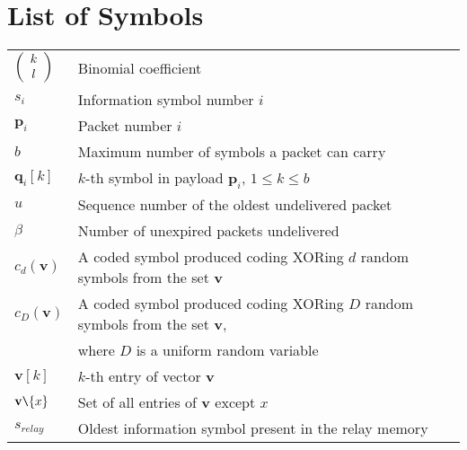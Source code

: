 \chapter*{List of Symbols}

\begin{longtable}{ll}

$\left( {\begin{array}{*{20}c}
                   k\\ l\\ \end{array}} \right) $  & Binomial coefficient\\

$s_i$ & Information symbol number $i$\\
$\mathbf{p}_i$ & Packet number $i$\\
$b$ & Maximum number of symbols a packet can carry\\
$\mathbf{q}_i[k]$ & $k$-th symbol in payload  $\mathbf{p}_i$, $1$$\leq$$k$$\leq$$b$\\
$u$ & Sequence number of the oldest undelivered packet\\
$\beta$ & Number of unexpired packets undelivered\\
$c_d(\mathbf{v})$ & A coded symbol produced coding XORing $d$ random symbols from the set $\mathbf{v}$\\
$c_D(\mathbf{v})$ & A coded symbol produced coding XORing $D$ random symbols from the set $\mathbf{v}$,\\
 & where $D$ is a uniform random variable\\
$\mathbf{v}[k]$ & $k$-th entry of vector $\mathbf{v}$\\
$\mathbf{v} \texttt{\char`\\} \{x\}$ & Set of all entries of $\mathbf{v}$ except $x$\\
$s_{relay}$ & Oldest information symbol present in the relay memory\\

\end{longtable}


























